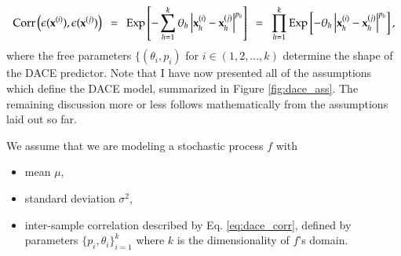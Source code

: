 \begin{equation} \label{eq:dace_corr}
\text{Corr}\left(\epsilon(\X^{(i)}),\epsilon(\X^{(j)})\right)\ \  = \ \ 
	\text{Exp}
		\left [ 
			-\sum_{h=1}^{k} 
				\theta_h \left | \X^{(i)}_h - \X^{(j)}_h \right | ^{p_h}
		\right ]\ \  = \ \ 
	\prod_{h=1}^{k}
		\text{Exp}
			\left [
				-\theta_h \left | \X^{(i)}_h - \X^{(j)}_h \right | ^{p_h}
			\right ],
\end{equation}
where the free parameters $\{(\theta_i,p_i)$ for $i \in (1,2,...,k)$ determine the shape of the DACE predictor. Note that I have now presented all of the assumptions which define the DACE model, summarized in Figure \ref{fig:dace_ass}. The remaining discussion more or less follows mathematically from the assumptions laid out so far.

\begin{minipage}{\textwidth}
\begin{framed}
We assume that we are modeling a stochastic process $f$ with
\begin{itemize}
\item mean $\mu$,
\item standard deviation $\sigma^2$,
\item inter-sample correlation described by Eq. \ref{eq:dace_corr}, defined by parameters $\{p_i,\theta_i\}_{i=1}^k$ where $k$ is the dimensionality of $f$'s domain. 
\end{itemize}


\end{framed}
\label{fig:dace_ass}
\end{minipage}




